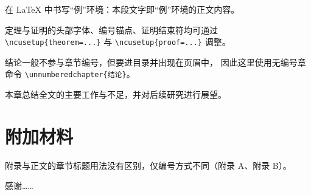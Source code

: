 \documentclass{ncubachelor}
\begin{document}
\begin{example}
在 \LaTeX{} 中书写“例”环境：本段文字即“例”环境的正文内容。
\end{example}

\begin{remark}
定理与证明的头部字体、编号锚点、证明结束符均可通过
\verb|\ncusetup{theorem=...}| 与 \verb|\ncusetup{proof=...}| 调整。
\end{remark}


结论一般不参与章节编号，但要进目录并出现在页眉中，
因此这里使用无编号章命令 \verb|\unnumberedchapter{结论}|。

本章总结全文的主要工作与不足，并对后续研究进行展望。

\appendix
\chapter{附加材料}\label{chap:appendix}

附录与正文的章节标题用法没有区别，仅编号方式不同（附录 A、附录 B）。

\backmatter



\begin{acknowledgements}
感谢……
\end{acknowledgements}
\end{document}
